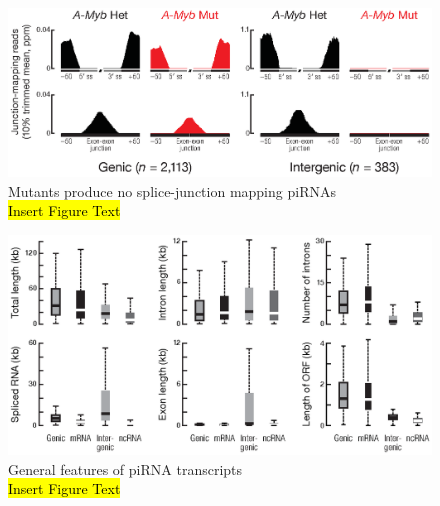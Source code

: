   \begin{figure} %
    \centering 
    \includegraphics{Figures/AppendixB/aggregatePiRNAsatSpliceJunctions.eps}
    \caption[\amyb{} Mutants produce no splice-junction mapping piRNAs]
    {
      \amyb{} Mutants produce no splice-junction mapping piRNAs\\[0.25cm]
      \hl{Insert Figure Text}
      }
    \label{SeqZipMethod:fig: amyb makes SJ mapping}
    \end{figure}

  \begin{figure} %
    \centering 
    \includegraphics{Figures/AppendixB/piRNAPrecusorTXFeatures.eps}
    \caption[General features of piRNA transcripts]
    {
      General features of piRNA transcripts\\[0.25cm]
      \hl{Insert Figure Text}
      }
    \label{SeqZipMethod:fig:piRNA precusor Tx features}
    \end{figure}






